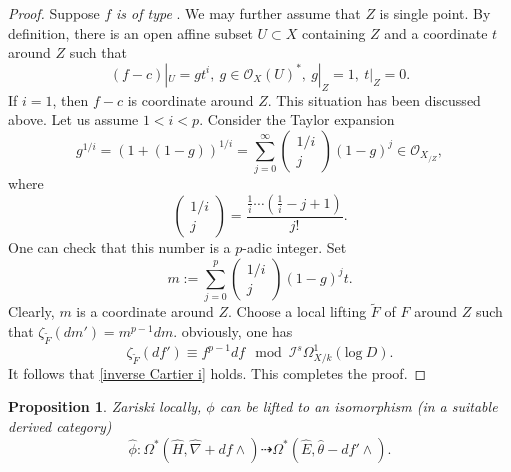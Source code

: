 \documentclass[12pt, a4paper]{article}
\newtheorem{proposition}{Proposition}[section]
\begin{document}
\begin{proof}
Suppose $f$ {\itshape is of type \uppercase\expandafter{}}. We may further assume that $Z$ is single point. By definition, there is an open affine subset $U\subset X$ containing $Z$ and a coordinate $t$ around $Z$ such that
$$
(f-c)|_U=gt^i,~g\in\mathcal O_X(U)^*,~g|_Z=1,~t|_Z=0.
$$
If $i=1$, then $f-c$ is coordinate around $Z$. This situation has been discussed above. Let us assume $1<i<p$. Consider the Taylor expansion
$$
g^{1/i}=(1+(1-g))^{1/i}=\sum_{j=0}^\infty\left(\begin{matrix}
1/i\\
j
\end{matrix}
\right)(1-g)^j\in\mathcal O_{X_{/Z}},
$$
where
$$
\left(\begin{matrix}
1/i\\
j
\end{matrix}
\right)=\frac{\frac{1}{i}\cdots(\frac{1}{i}-j+1)}{j!}.
$$
One can check that this number is a $p$-adic integer. Set
$$
m:=\sum_{j=0}^p\left(\begin{matrix}
1/i\\
j
\end{matrix}
\right)(1-g)^jt.$$
Clearly, $m$ is a coordinate around $Z$.
Choose a local lifting $\tilde F$ of $F$ around $Z$ such that $\zeta_{\tilde F}(dm')=m^{p-1}dm$. obviously, one has
$$
\zeta_{\tilde F}(df')\equiv f^{p-1}df\mod \mathcal I^s\Omega^1_{X/k}(\mathrm{log}~D).
$$
 It follows that \eqref{inverse Cartier i} holds. This completes the proof.
\end{proof}
\begin{proposition}
Zariski locally, $\phi$ can be lifted to an isomorphism (in a suitable derived category)
$$
\hat\phi:\Omega^*(\hat H,\hat\nabla+df\wedge)\dashrightarrow\Omega^*(\hat E,\hat\theta-df'\wedge).
$$
\end{proposition}
\end{document}
